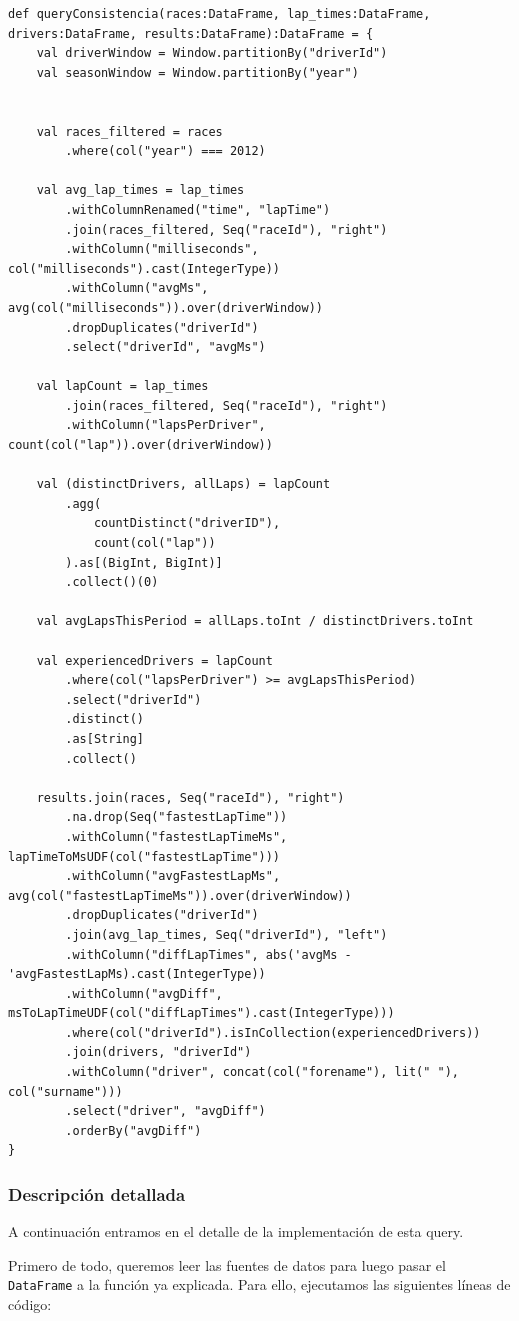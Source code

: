 \documentclass[12pt,twoside,titlepage]{report}
\begin{document}
\begin{lstlisting}
def queryConsistencia(races:DataFrame, lap_times:DataFrame, drivers:DataFrame, results:DataFrame):DataFrame = {
	val driverWindow = Window.partitionBy("driverId")
	val seasonWindow = Window.partitionBy("year")
	
	
	val races_filtered = races
		.where(col("year") === 2012)
	
	val avg_lap_times = lap_times
		.withColumnRenamed("time", "lapTime")
		.join(races_filtered, Seq("raceId"), "right")
		.withColumn("milliseconds", col("milliseconds").cast(IntegerType))
		.withColumn("avgMs", avg(col("milliseconds")).over(driverWindow))
		.dropDuplicates("driverId")
		.select("driverId", "avgMs")
	
	val lapCount = lap_times
		.join(races_filtered, Seq("raceId"), "right")
		.withColumn("lapsPerDriver", count(col("lap")).over(driverWindow))
	
	val (distinctDrivers, allLaps) = lapCount
		.agg(
			countDistinct("driverID"),
			count(col("lap"))
		).as[(BigInt, BigInt)]
		.collect()(0)
	
	val avgLapsThisPeriod = allLaps.toInt / distinctDrivers.toInt
		
	val experiencedDrivers = lapCount
		.where(col("lapsPerDriver") >= avgLapsThisPeriod)
		.select("driverId")
		.distinct()
		.as[String]
		.collect()
	
	results.join(races, Seq("raceId"), "right")
		.na.drop(Seq("fastestLapTime"))
		.withColumn("fastestLapTimeMs", lapTimeToMsUDF(col("fastestLapTime")))
		.withColumn("avgFastestLapMs", avg(col("fastestLapTimeMs")).over(driverWindow))
		.dropDuplicates("driverId")
		.join(avg_lap_times, Seq("driverId"), "left")
		.withColumn("diffLapTimes", abs('avgMs - 'avgFastestLapMs).cast(IntegerType))
		.withColumn("avgDiff", msToLapTimeUDF(col("diffLapTimes").cast(IntegerType)))
		.where(col("driverId").isInCollection(experiencedDrivers))
		.join(drivers, "driverId")
		.withColumn("driver", concat(col("forename"), lit(" "), col("surname")))
		.select("driver", "avgDiff")
		.orderBy("avgDiff")
}
\end{lstlisting}

\subsubsection{Descripción detallada}

A continuación entramos en el detalle de la implementación de esta query.

Primero de todo, queremos leer las fuentes de datos para luego pasar el \texttt{DataFrame} a la función ya explicada. Para ello, ejecutamos las siguientes líneas de código:
\end{document}
